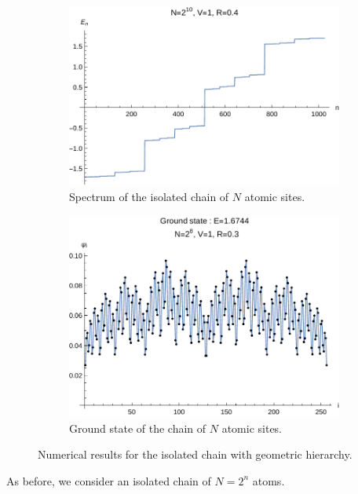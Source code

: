 \documentclass[11pt]{article}
\begin{document}
\begin{figure}[htp]
\centering
\begin{subfigure}{.5\textwidth}
  \centering
  \includegraphics[width=.9\linewidth]{data/spectrum_isolated_hchain.pdf}
  \caption{Spectrum of the isolated chain of $N$ atomic sites.}
  \label{fig:sp_isolated}
\end{subfigure}%
\begin{subfigure}{.5\textwidth}
  \centering
  \includegraphics[width=.9\linewidth]{data/ground_state_isolated_hchain.pdf}
  \caption{Ground state of the chain of $N$ atomic sites.}
  \label{fig:gs_isolated}
\end{subfigure}
\caption{Numerical results for the isolated chain with geometric hierarchy.}
\label{fig:num_geom}
\end{figure}

As before, we consider an isolated chain of $N=2^n$ atoms.
\end{document}
